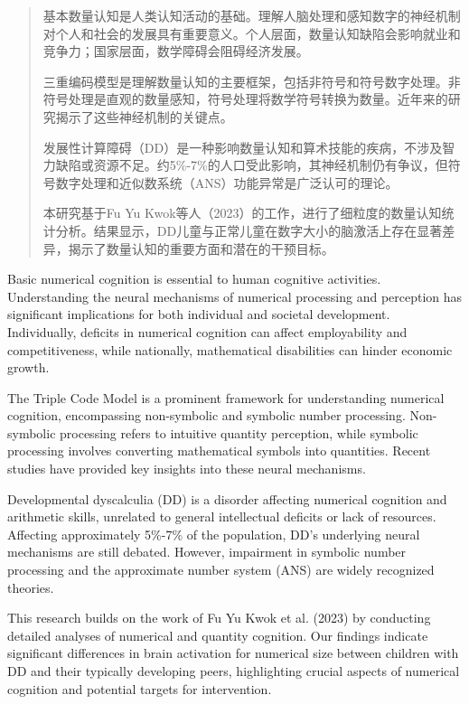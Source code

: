 \documentclass[bachelor, comfort]{shtthesis}
\begin{document}
\maketitle

\pagestyle{RomanNumberedWithLogo}

\begin{abstract}
	基本数量认知是人类认知活动的基础。理解人脑处理和感知数字的神经机制对个人和社会的发展具有重要意义。个人层面，数量认知缺陷会影响就业和竞争力；国家层面，数学障碍会阻碍经济发展。

	三重编码模型是理解数量认知的主要框架，包括非符号和符号数字处理。非符号处理是直观的数量感知，符号处理将数学符号转换为数量。近年来的研究揭示了这些神经机制的关键点。

	发展性计算障碍（DD）是一种影响数量认知和算术技能的疾病，不涉及智力缺陷或资源不足。约5\%-7\%的人口受此影响，其神经机制仍有争议，但符号数字处理和近似数系统（ANS）功能异常是广泛认可的理论。

	本研究基于Fu Yu Kwok等人（2023）的工作，进行了细粒度的数量认知统计分析。结果显示，DD儿童与正常儿童在数字大小的脑激活上存在显著差异，揭示了数量认知的重要方面和潜在的干预目标。
\end{abstract}


\begin{abstract*}
	Basic numerical cognition is essential to human cognitive activities. Understanding the neural mechanisms of numerical processing and perception has significant implications for both individual and societal development. Individually, deficits in numerical cognition can affect employability and competitiveness, while nationally, mathematical disabilities can hinder economic growth.

	The Triple Code Model is a prominent framework for understanding numerical cognition, encompassing non-symbolic and symbolic number processing. Non-symbolic processing refers to intuitive quantity perception, while symbolic processing involves converting mathematical symbols into quantities. Recent studies have provided key insights into these neural mechanisms.

	Developmental dyscalculia (DD) is a disorder affecting numerical cognition and arithmetic skills, unrelated to general intellectual deficits or lack of resources. Affecting approximately 5\%-7\% of the population, DD's underlying neural mechanisms are still debated. However, impairment in symbolic number processing and the approximate number system (ANS) are widely recognized theories.

	This research builds on the work of Fu Yu Kwok et al. (2023) by conducting detailed analyses of numerical and quantity cognition. Our findings indicate significant differences in brain activation for numerical size between children with DD and their typically developing peers, highlighting crucial aspects of numerical cognition and potential targets for intervention.

\end{abstract*}
\end{document}
